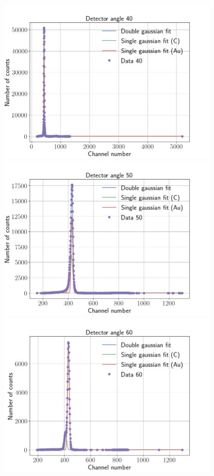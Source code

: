 \onecolumn
\vspace*{\fill} 
\centering
\textbf{}
\vspace*{\fill} 

\clearpage
\twocolumn
\begin{figure}[t]
\centering
\includegraphics[width=0.99\columnwidth]{Data_40}
\includegraphics[width=0.99\columnwidth]{Data_50}
\includegraphics[width=0.99\columnwidth]{Data_60}

\end{figure}
